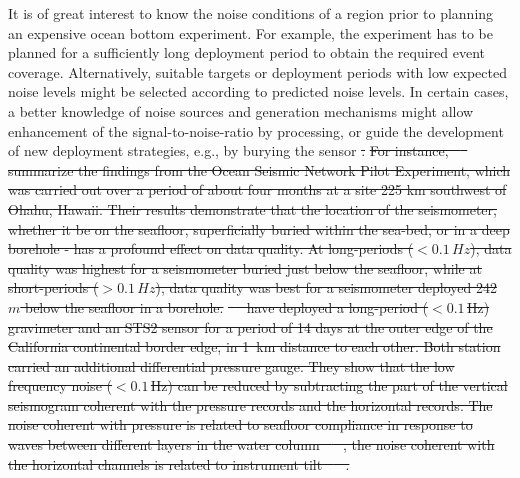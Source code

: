 \documentclass{article}
\providecommand{\DIFadd}[1]{{\protect\color{blue}\uwave{#1}}} %
\providecommand{\DIFdel}[1]{{\protect\color{red}\sout{#1}}}                      %
\providecommand{\DIFaddbegin}{} %
\providecommand{\DIFaddend}{} %
\providecommand{\DIFdelbegin}{} %
\providecommand{\DIFdelend}{} %
\begin{document}
{It is of great interest to know the noise 
conditions of a region prior to planning an expensive ocean 
bottom experiment.   
For example, the experiment has to be planned for a sufficiently
long deployment period to obtain the required event
coverage. Alternatively, suitable targets or deployment periods with
low expected noise levels might be selected according to predicted
noise levels. In certain cases, a better knowledge of noise sources and
generation mechanisms might allow enhancement of the
signal-to-noise-ratio by processing, or guide the development of new
deployment strategies, e.g., by burying the sensor \DIFdelbegin \DIFdel{.
}%
\DIFdel{For instance, 
\mbox{%
\cite{collins:01}
}%
summarize the findings from the 
Ocean Seismic Network Pilot Experiment, which was carried out 
over a period of about four months at a site 225 km southwest 
of Ohahu, Hawaii.
Their results demonstrate that the location of the seismometer, whether 
it be on the seafloor, superficially buried within the sea-bed, 
or in a deep borehole - has a profound effect on data quality.
At long-periods ($< 0.1\, Hz$), data quality was highest 
for a seismometer buried just below the seafloor, while at 
short-periods ($>0.1 \, Hz$), data quality was best for a seismometer
deployed 242 $m$ below the seafloor in a borehole.  
}%
\DIFdel{\mbox{%
\cite{crawford:00}
}%
have deployed a long-period ($<0.1\, $Hz)
gravimeter and an STS2 sensor for a period of 14 days 
at the outer edge of the California continental border edge,
in 1~km distance to each other. 
Both station carried an additional differential pressure gauge.
They show that the low frequency noise ($<0.1\, $Hz) 
can be reduced by subtracting the part of the vertical seismogram 
coherent with the pressure records and the horizontal records. The
noise coherent with pressure is related to seafloor
compliance in response to waves between different layers in the water
column \mbox{%
\cite[][]{webb:99}
}%
, the noise coherent with the horizontal channels 
is related to instrument tilt \mbox{%
\cite[e.g.][]{crawford:00}
}%
.
}\DIFdelend \DIFaddbegin \DIFadd{\mbox{%
\cite[e.g.,][]{collins:01}
}%
.
}\DIFaddend 

}
\end{document}
